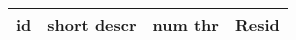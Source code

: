 \documentclass[a4paper,12pt]{article}
\begin{document}

\begin{tabular} {|c|c|c|l|}
id & short descr & num thr & Resid \\
\hline

\end{tabular}
\end{document}
